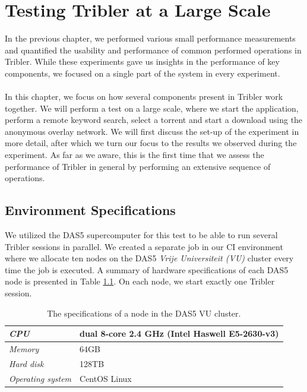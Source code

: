 \chapter{Testing Tribler at a Large Scale}
\label{chapter:large-scale-experiment}
In the previous chapter, we performed various small performance measurements and quantified the usability and performance of common performed operations in Tribler. While these experiments gave us insights in the performance of key components, we focused on a single part of the system in every experiment.\\\\
In this chapter, we focus on how several components present in Tribler work together. We will perform a test on a large scale, where we start the application, perform a remote keyword search, select a torrent and start a download using the anonymous overlay network. We will first discuss the set-up of the experiment in more detail, after which we turn our focus to the results we observed during the experiment. As far as we aware, this is the first time that we assess the performance of Tribler in general by performing an extensive sequence of operations.

\section{Environment Specifications}
We utilized the DAS5 supercomputer for this test to be able to run several Tribler sessions in parallel. We created a separate job in our CI environment where we allocate ten nodes on the DAS5 \emph{Vrije Universiteit (VU)} cluster every time the job is executed. A summary of hardware specifications of each DAS5 node is presented in Table \ref{table:das5-node-specifications}. On each node, we start exactly one Tribler session.

\begin{table}[h!]
	\centering
	\begin{tabular}{|l|l|}
		\hline
		\emph{CPU} & dual 8-core 2.4 GHz (Intel Haswell E5-2630-v3)\\ \hline
		\emph{Memory} & 64GB \\ \hline
		\emph{Hard disk} & 128TB \\ \hline
		\emph{Operating system} & CentOS Linux \\ \hline
	\end{tabular}
	\caption{The specifications of a node in the DAS5 VU cluster.}
	\label{table:das5-node-specifications}
\end{table}

